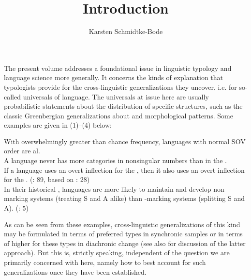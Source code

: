\documentclass[output=paper]{langsci/langscibook}
\author{Karsten Schmidtke-Bode\affiliation{Leipzig University and Friedrich Schiller University Jena}}
\title{Introduction}
\begin{document}
\maketitle 
 




\noindent The present volume addresses a foundational issue in linguistic typology and language science more generally. It concerns the kinds of explanation that typologists provide for the cross-linguistic generalizations they uncover, i.e. for so-called universals of language. The universals at issue here are usually probabilistic statements about the distribution of specific structures, such as the classic Greenbergian  generalizations about  and morphological  patterns. Some examples are given in (1)–(4) below:

\ea 
{With overwhelmingly greater than chance frequency, languages with normal SOV order are al. \citep[79]{Greenberg1963}}\\
\z
\ea
{A language never has more  categories in nonsingular numbers than in the . \citep[95]{Greenberg1963}}\\
\z
\ea
{If a language uses an overt inflection for the , then it also uses an overt inflection for the . (\citealt{Croft2003}: 89, based on \citealt{Greenberg1966}: 28)}\\
\z 
\ea
{In their historical , languages are more likely to maintain and develop non- -marking systems (treating S and A alike) than  -marking systems (splitting S and A). (\citealt{BickelEtAl2015}: 5)}\\
\z

As can be seen from these examples, cross-linguistic generalizations of this kind may be formulated in terms of preferred types in synchronic samples or in terms of higher  for these types in diachronic change (see also \citealt{Greenberg1978_Diachr,Maslova2000,Cysouw2011,Bickel2013} for discussion of the latter approach). But this is, strictly speaking, independent of the question we are primarily concerned with here, namely how to best account for such generalizations once they have been established.
\end{document}
